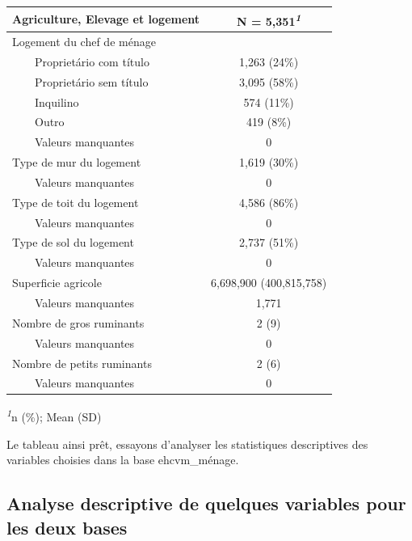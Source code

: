 \documentclass[
]{article}
\begin{document}
\begin{table}[!t]
\fontsize{12.0pt}{14.4pt}\selectfont
\begin{tabular*}{\linewidth}{@{\extracolsep{\fill}}lc}
\toprule
Agriculture, Elevage et logement & \textbf{N = 5,351}\textsuperscript{\textit{1}} \\ 
\midrule\addlinespace[2.5pt]
Logement du chef de ménage &  \\ 
    Proprietário com título & 1,263 (24\%) \\ 
    Proprietário sem título & 3,095 (58\%) \\ 
    Inquilino & 574 (11\%) \\ 
    Outro & 419 (8\%) \\ 
    Valeurs manquantes & 0 \\ 
Type de mur du logement & 1,619 (30\%) \\ 
    Valeurs manquantes & 0 \\ 
Type de toit du logement & 4,586 (86\%) \\ 
    Valeurs manquantes & 0 \\ 
Type de sol du logement & 2,737 (51\%) \\ 
    Valeurs manquantes & 0 \\ 
Superficie agricole & 6,698,900 (400,815,758) \\ 
    Valeurs manquantes & 1,771 \\ 
Nombre de gros ruminants & 2 (9) \\ 
    Valeurs manquantes & 0 \\ 
Nombre de petits ruminants & 2 (6) \\ 
    Valeurs manquantes & 0 \\ 
\bottomrule
\end{tabular*}
\begin{minipage}{\linewidth}
\textsuperscript{\textit{1}}n (\%); Mean (SD)\\
\end{minipage}
\end{table}

Le tableau ainsi prêt, essayons d'analyser les statistiques descriptives
des variables choisies dans la base ehcvm\_ménage.

\subsection{Analyse descriptive de quelques variables pour les deux
bases}\label{analyse-descriptive-de-quelques-variables-pour-les-deux-bases}
\end{document}
